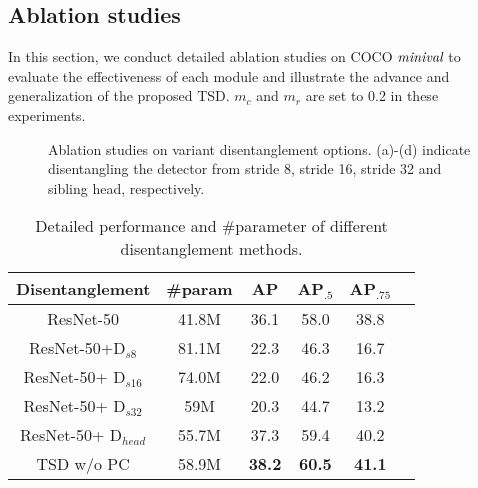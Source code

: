 \documentclass[10pt,twocolumn,letterpaper]{article}
\def \algname{TSD}
\def \loss{PC}
\begin{document}
\subsection{Ablation studies}
In this section, we conduct detailed ablation studies on COCO $\emph{minival}$ to evaluate the effectiveness of each module and illustrate the advance and generalization of the proposed \algname{}. $m_c$ and $m_r$ are set to 0.2 in these experiments.

\begin{figure}[t]
  \centering 
  \caption{Ablation studies on variant disentanglement options. (a)-(d) indicate disentangling the detector from stride 8, stride 16, stride 32 and sibling head, respectively.} 
  \label{fig:subfig}
\end{figure}



\begin{table}[h]
\centering
\begin{center}
\begin{tabular}{c|c|c|c c c}
\hline  
Disentanglement & \#param &AP & AP$_{.5}$ & AP$_{.75}$\\
\hline
ResNet-50 & 41.8M& 36.1 &58.0 & 38.8\\
ResNet-50+D$_{s8}$ & 81.1M &22.3 & 46.3& 16.7\\
ResNet-50+ D$_{s16}$ &74.0M  &22.0 & 46.2 &16.3 \\
ResNet-50+ D$_{s32}$&59M  & 20.3 & 44.7 & 13.2\\
ResNet-50+ D$_{head}$&55.7M  & 37.3 & 59.4 & 40.2\\
\algname{} w/o \loss{}& 58.9M  &\bf{38.2} & \bf{60.5} & \bf{41.1}\\
\hline
\end{tabular}
\end{center}
\caption{Detailed performance and \#parameter of different disentanglement methods.}
\label{tab:ablation}
\end{table}
\end{document}
